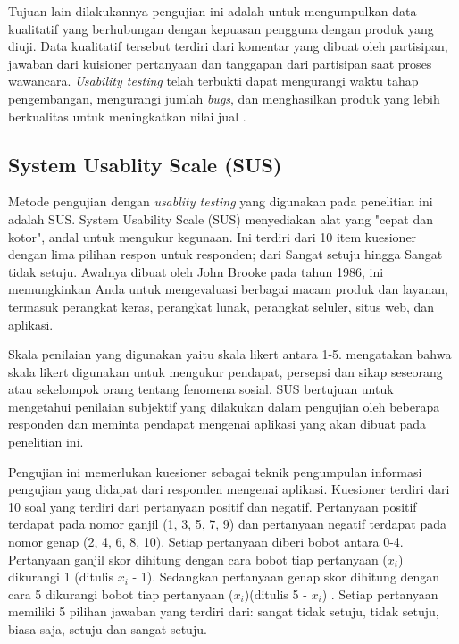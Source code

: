 \par Tujuan lain dilakukannya pengujian ini adalah untuk mengumpulkan data kualitatif yang berhubungan dengan kepuasan pengguna dengan produk yang diuji. Data kualitatif tersebut terdiri dari komentar yang dibuat oleh partisipan, jawaban dari kuisioner pertanyaan dan tanggapan dari partisipan saat proses wawancara. \textit{Usability testing} telah terbukti dapat mengurangi waktu tahap pengembangan, mengurangi jumlah \textit{bugs}, dan menghasilkan produk yang lebih berkualitas untuk meningkatkan nilai jual \citep{Wahl2000}.

\subsection{System Usablity Scale (SUS)}
Metode pengujian dengan \textit{usablity testing} yang digunakan pada penelitian ini adalah SUS. System Usability Scale (SUS) menyediakan alat yang "cepat dan kotor", andal untuk mengukur kegunaan. Ini terdiri dari 10 item kuesioner dengan lima pilihan respon untuk responden; dari Sangat setuju hingga Sangat tidak setuju. Awalnya dibuat oleh John Brooke pada tahun 1986, ini memungkinkan Anda untuk mengevaluasi berbagai macam produk dan layanan, termasuk perangkat keras, perangkat lunak, perangkat seluler, situs web, dan aplikasi.

\par Skala penilaian yang digunakan yaitu skala likert antara 1-5. \cite{Sugiyono2004} mengatakan bahwa skala likert digunakan untuk mengukur pendapat, persepsi dan sikap seseorang atau sekelompok orang tentang fenomena sosial. SUS bertujuan untuk mengetahui penilaian subjektif yang dilakukan dalam pengujian oleh beberapa responden dan meminta pendapat mengenai aplikasi yang akan dibuat pada penelitian ini.

\par Pengujian ini memerlukan kuesioner sebagai teknik pengumpulan informasi pengujian yang didapat dari responden mengenai aplikasi. Kuesioner terdiri dari 10 soal yang terdiri dari pertanyaan positif dan negatif. Pertanyaan positif terdapat pada nomor ganjil (1, 3, 5, 7, 9) dan pertanyaan negatif terdapat pada nomor genap (2, 4, 6, 8, 10). Setiap pertanyaan diberi bobot antara 0-4. Pertanyaan ganjil skor dihitung dengan cara bobot tiap pertanyaan ($x_{i}$) dikurangi 1 (ditulis $x_{i}$ - 1). Sedangkan pertanyaan genap skor dihitung dengan cara 5 dikurangi bobot tiap pertanyaan ($x_{i}$)(ditulis 5 - $x_{i}$) \citep{Ardiansyah2016}. Setiap pertanyaan memiliki 5 pilihan jawaban yang terdiri dari: sangat tidak setuju, tidak setuju, biasa saja, setuju dan sangat setuju.

